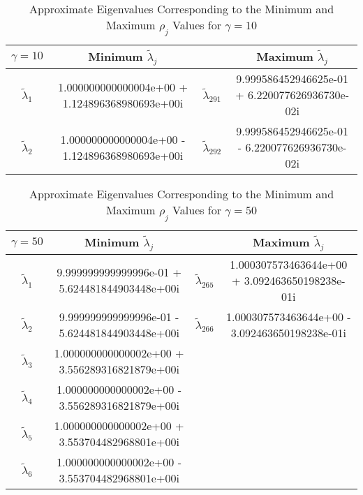 \documentclass[12pt]{article}
\begin{document}
\begin{table}[H]
\renewcommand{\arraystretch}{1.5}
\begin{small}
\hspace{-.85in}
\begin{tabular}{| c | c || c | c |}
\hline
$\gamma = 10$ &  \textbf{Minimum $\tilde{\lambda}_j$} &   &  \textbf{Maximum $\tilde{\lambda}_j$} \\
\hline 
\hline
$\tilde{\lambda}_1$ & 1.000000000000004e+00 + 1.124896368980693e+00i  & $\tilde{\lambda}_{291}$ & 9.999586452946625e-01 + 6.220077626936730e-02i  \\
$\tilde{\lambda}_2$ & 1.000000000000004e+00 - 1.124896368980693e+00i  & $\tilde{\lambda}_{292}$ &  9.999586452946625e-01 - 6.220077626936730e-02i \\
\hline
\end{tabular}
\end{small}
\caption{Approximate Eigenvalues Corresponding to the Minimum and Maximum $\rho_j$ Values for $\gamma = 10$}
\end{table} 

\begin{table}[H]
\renewcommand{\arraystretch}{1.5}
\begin{small}
\hspace{-.9in}
\begin{tabular}{| c | c || c | c |}
\hline
$\gamma = 50$ &  \textbf{Minimum $\tilde{\lambda}_j$} &   &  \textbf{Maximum $\tilde{\lambda}_j$} \\
\hline 
\hline
$\tilde{\lambda}_1$ & 9.999999999999996e-01 + 5.624481844903448e+00i  & $\tilde{\lambda}_{265}$ & 1.000307573463644e+00 + 3.092463650198238e-01i  \\
$\tilde{\lambda}_2$ & 9.999999999999996e-01 - 5.624481844903448e+00i  & $\tilde{\lambda}_{266}$ &  1.000307573463644e+00 - 3.092463650198238e-01i \\
$\tilde{\lambda}_3$ & 1.000000000000002e+00 + 3.556289316821879e+00i  &  &   \\
$\tilde{\lambda}_4$ &  1.000000000000002e+00 - 3.556289316821879e+00i &  &   \\
$\tilde{\lambda}_5$ & 1.000000000000002e+00 + 3.553704482968801e+00i  &  &   \\
$\tilde{\lambda}_6$ & 1.000000000000002e+00 - 3.553704482968801e+00i
  &  &   \\
\hline
\end{tabular}
\end{small}
\caption{Approximate Eigenvalues Corresponding to the Minimum and Maximum $\rho_j$ Values for $\gamma = 50$}
\end{table} 
\end{document}
